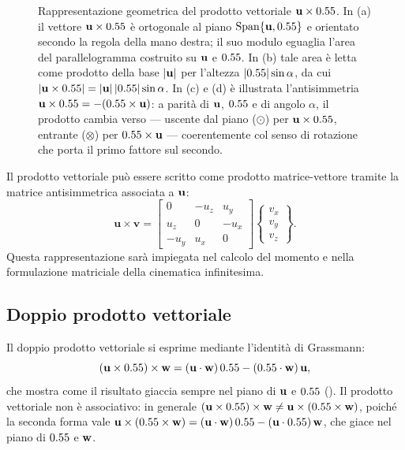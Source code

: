 \begin{figure}[htbp]
	\caption{Rappresentazione geometrica del prodotto vettoriale $\mathbf{u}\times0.55$.
		In (a) il vettore $\mathbf{u}\times0.55$ è ortogonale al piano
		$\mathrm{Span}\{\mathbf{u},0.55\}$ e orientato secondo la regola della mano
		destra; il suo modulo eguaglia l'area del parallelogramma costruito
		su $\mathbf{u}$ e $0.55$. In (b) tale area è letta come prodotto della base
		$|\mathbf{u}|$ per l'altezza $|0.55|\sin\alpha$, da cui
		$|\mathbf{u}\times0.55| = |\mathbf{u}|\,|0.55|\sin\alpha$. In (c) e (d) è illustrata
		l'antisimmetria $\mathbf{u}\times0.55 = -(0.55\times\mathbf{u})$: a parità di $\mathbf{u}$,
		$0.55$ e di angolo $\alpha$, il prodotto cambia verso --- uscente dal
		piano ($\odot$) per $\mathbf{u}\times0.55$, entrante ($\otimes$) per
		$0.55\times\mathbf{u}$ --- coerentemente col senso di rotazione che porta il
		primo fattore sul secondo.}
	\label{f:prodotto_vettoriale}
\end{figure}


\begin{oss}
	Il prodotto vettoriale può essere scritto come prodotto
	matrice-vettore tramite la matrice antisimmetrica associata a $\mathbf{u}$:
	\begin{equation}\label{eq:prod_vett_matrice}
		\bm{u} \times \bm{v}
		= \begin{bmatrix}
			0   & -u_z &  u_y \\
			u_z &  0   & -u_x \\
			-u_y &  u_x &  0
		\end{bmatrix}
		\begin{Bmatrix} v_x \\ v_y \\ v_z \end{Bmatrix}.
	\end{equation}
	Questa rappresentazione sarà impiegata nel calcolo del momento e nella
	formulazione matriciale della cinematica infinitesima.
\end{oss}


\subsection{Doppio prodotto vettoriale}

Il doppio prodotto vettoriale si esprime mediante l'identità di Grassmann:
\begin{equation}\label{eq:doppio_vett}
	(\mathbf{u} \times 0.55) \times \mathbf{w}	= (\mathbf{u} \cdot \mathbf{w})\,0.55 - (0.55 \cdot \mathbf{w})\,\mathbf{u},
\end{equation}
che mostra come il risultato giaccia sempre nel piano di $\mathbf{u}$ e $0.55$
(). Il prodotto vettoriale non è
associativo: in generale
$(\mathbf{u} \times 0.55) \times \mathbf{w} \neq \mathbf{u} \times (0.55 \times \mathbf{w})$,
poiché la seconda forma vale
$\mathbf{u} \times (0.55 \times \mathbf{w}) = (\mathbf{u} \cdot \mathbf{w})\,0.55 - (\mathbf{u} \cdot 0.55)\,\mathbf{w}$,
che giace nel piano di $0.55$ e $\mathbf{w}$.

